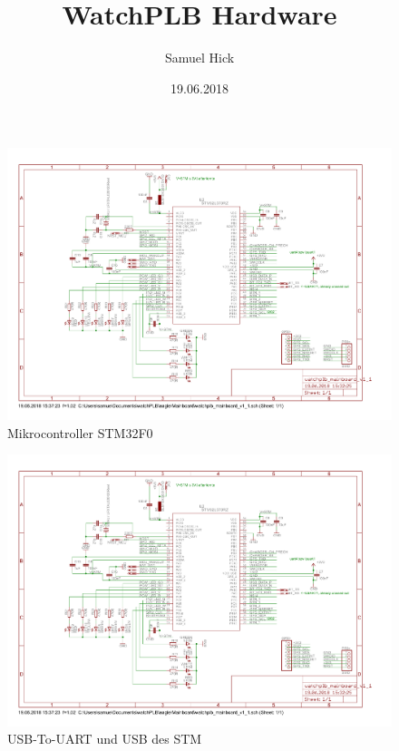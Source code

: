 \documentclass[a4paper]{scrartcl}
\title{WatchPLB Hardware}
\author{Samuel Hick}
\date{19.06.2018}
\begin{document}
\listoffigures   

\newpage

\begin{figure}[htb]\centering
\includegraphics[page=1, angle=90, width=\linewidth]{../Mainboard/watchplb_mainboard_v1_1.pdf}
\caption{Mikrocontroller STM32F0}
\label{fig:abb1}
\end{figure}

\begin{figure}[htb]\centering
\includegraphics[page=2, angle=90, width=\linewidth]{../Mainboard/watchplb_mainboard_v1_1.pdf}
\caption{USB-To-UART und USB des STM}
\label{fig:abb1}
\end{figure}
\end{document}

